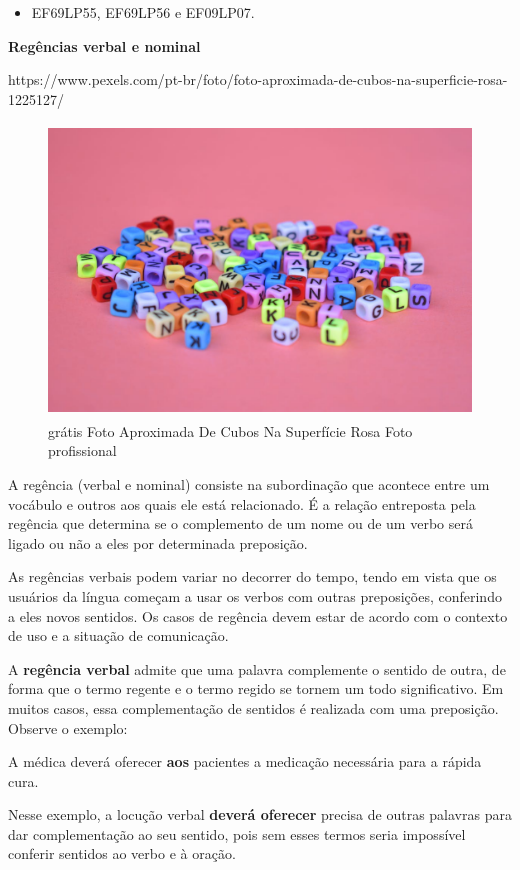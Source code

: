\begin{itemize}
\begin{itemize}
{\begin{itemize}
\begin{itemize}
{\begin{itemize}
\item EF69LP55, EF69LP56 e EF09LP07.
\end{itemize}

\textbf{Regências verbal e nominal}

https://www.pexels.com/pt-br/foto/foto-aproximada-de-cubos-na-superficie-rosa-1225127/

\begin{figure}
\centering
\includegraphics[width=4.56250in,height=3.06080in]{./_SAEB_9_POR/media/image30.jpeg}
\caption{grátis Foto Aproximada De Cubos Na Superfície Rosa Foto
profissional}
\end{figure}

A regência (verbal e nominal) consiste na subordinação que acontece
entre um vocábulo e outros aos quais ele está relacionado. É a relação
entreposta pela regência que determina se o complemento de um nome ou de
um verbo será ligado ou não a eles por determinada preposição.

As regências verbais podem variar no decorrer do tempo, tendo em vista
que os usuários da língua começam a usar os verbos com outras
preposições, conferindo a eles novos sentidos. Os casos de regência
devem estar de acordo com o contexto de uso e a situação de comunicação.

A \textbf{regência verbal} admite que uma palavra complemente o sentido
de outra, de forma que o termo regente e o termo regido se tornem um
todo significativo. Em muitos casos, essa complementação de sentidos é
realizada com uma preposição. Observe o exemplo:

A médica deverá oferecer \textbf{aos} pacientes a medicação necessária
para a rápida cura.

Nesse exemplo, a locução verbal \textbf{deverá oferecer} precisa de
outras palavras para dar complementação ao seu sentido, pois sem esses
termos seria impossível conferir sentidos ao verbo e à oração.

}
\end{itemize}
\end{itemize}}
\end{itemize}
\end{itemize}
